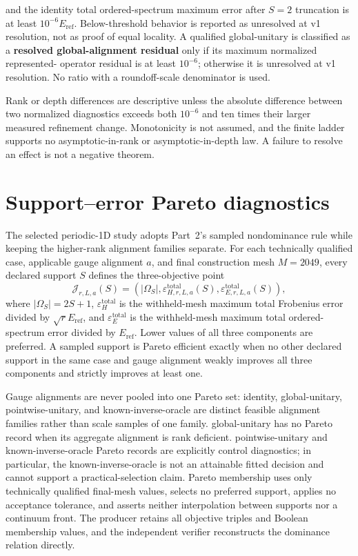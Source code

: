 \documentclass[11pt]{article}
\begin{document}
and the identity total ordered-spectrum maximum error after $S=2$ truncation is at least
$10^{-6}E_{\mathrm{ref}}$. Below-threshold behavior is reported as unresolved at v1
resolution, not as proof of equal locality. A qualified global-unitary is classified as a
\textbf{resolved global-alignment residual} only if its maximum normalized represented-
operator residual is at least $10^{-6}$; otherwise it is unresolved at v1 resolution.
No ratio with a roundoff-scale denominator is used.

Rank or depth differences are descriptive unless the absolute difference between two
normalized diagnostics exceeds both $10^{-6}$ and ten times their larger measured
refinement change. Monotonicity is not assumed, and the finite ladder supports no
asymptotic-in-rank or asymptotic-in-depth law. A failure to resolve an effect is not a
negative theorem.

\section{Support--error Pareto diagnostics}

The selected periodic-1D study adopts Part~2's sampled nondominance rule while keeping the higher-rank alignment
families separate. For each technically qualified case, applicable gauge alignment $a$, and
final construction mesh $M=2049$, every declared support $S$ defines the three-objective
point
\[
 \mathcal J_{r,L,a}(S)=\left(
 |\Omega_S|,
 \varepsilon_{H,r,L,a}^{\mathrm{total}}(S),
 \varepsilon_{E,r,L,a}^{\mathrm{total}}(S)
 \right),
\]
where $|\Omega_S|=2S+1$, $\varepsilon_H^{\mathrm{total}}$ is the withheld-mesh maximum
total Frobenius error divided by $\sqrt rE_{\mathrm{ref}}$, and
$\varepsilon_E^{\mathrm{total}}$ is the withheld-mesh maximum total ordered-spectrum
error divided by $E_{\mathrm{ref}}$. Lower values of all three components are preferred.
A sampled support is Pareto efficient exactly when no other declared support in the same
case and gauge alignment weakly improves all three components and strictly improves at least one.

Gauge alignments are never pooled into one Pareto set: identity, global-unitary, pointwise-unitary, and known-inverse-oracle are distinct feasible
alignment families rather than scale samples of one family. global-unitary has no Pareto record
when its aggregate alignment is rank deficient. pointwise-unitary and known-inverse-oracle Pareto records are explicitly
control diagnostics; in particular, the known-inverse-oracle is not an attainable
fitted decision and cannot support a practical-selection claim. Pareto membership uses
only technically qualified final-mesh values, selects no preferred support, applies no
acceptance tolerance, and asserts neither interpolation between supports nor a continuum
front. The producer retains all objective triples and Boolean membership values, and
the independent verifier reconstructs the dominance relation directly.
\end{document}
